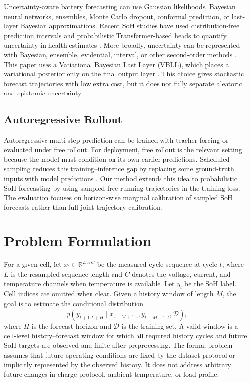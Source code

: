 \documentclass[conference]{IEEEtran}
\begin{document}
Uncertainty-aware battery forecasting can use Gaussian likelihoods, Bayesian
neural networks, ensembles, Monte Carlo dropout, conformal prediction, or
last-layer Bayesian approximations. Recent SoH studies have used
distribution-free prediction intervals and probabilistic Transformer-based heads to
quantify uncertainty in health estimates
\cite{rasul2026ensemble,munna2026fusion}.
More broadly, uncertainty can be represented with Bayesian, ensemble,
evidential, interval, or other second-order methods
\cite{wang2026uqreview}. This paper uses a Variational Bayesian Last Layer
(VBLL), which places a variational posterior only on the final output layer
\cite{harrison2024vbll}. This choice gives stochastic forecast trajectories
with low extra cost, but it does not fully separate aleatoric and epistemic
uncertainty.

\subsection{Autoregressive Rollout}

Autoregressive multi-step prediction can be trained with teacher forcing or
evaluated under free rollout. For deployment, free rollout is the relevant
setting because the model must condition on its own earlier predictions.
Scheduled sampling reduces this training--inference gap by replacing some
ground-truth inputs with model predictions \cite{bengio2015scheduled}. Our
method extends this idea to probabilistic SoH forecasting by using sampled
free-running trajectories in the training loss. The evaluation focuses on
horizon-wise marginal calibration of sampled SoH forecasts rather than full
joint trajectory calibration.

\section{Problem Formulation}

For a given cell, let $x_t \in \mathbb{R}^{L \times C}$ be the measured cycle
sequence at cycle $t$, where $L$ is the resampled sequence length and $C$
denotes the voltage, current, and temperature channels when temperature is
available. Let $y_t$ be the SoH label. Cell indices are omitted when clear.
Given a history window of length $M$, the goal is to estimate the conditional
distribution
\begin{equation}
p\left(y_{t+1:t+H} \mid x_{t-M+1:t}, y_{t-M+1:t}, \mathcal{D}\right),
\end{equation}
where $H$ is the forecast horizon and $\mathcal{D}$ is the training set. A valid window is a
cell-level history--forecast window for which all required history cycles and
future SoH targets are observed and finite after preprocessing. The formal problem
assumes that future operating conditions are fixed by the dataset protocol or
implicitly represented by the observed history. It does not address arbitrary
future changes in charge protocol, ambient temperature, or load profile.
\end{document}
